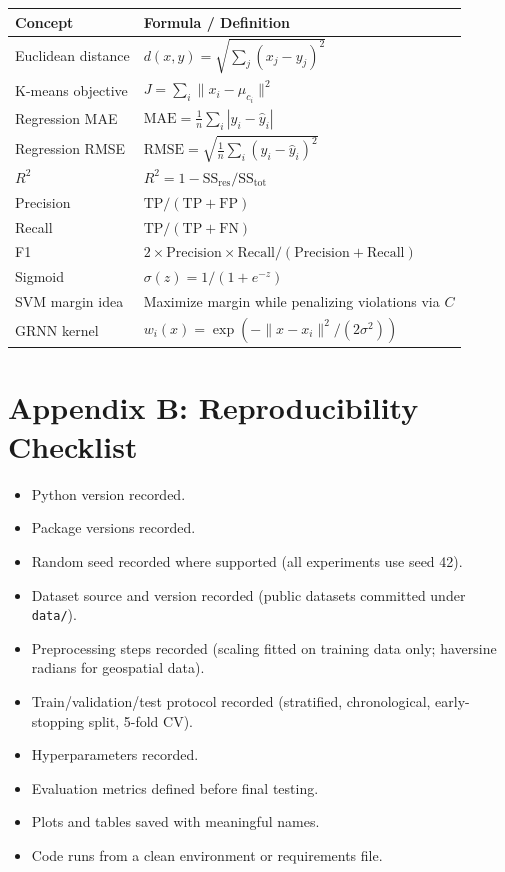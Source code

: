 \begin{longtable}{|p{}|p{}|}
\hline
\rowcolor{mlblue!8}\textbf{Concept} & \textbf{Formula / Definition} \\
\hline
\endhead
Euclidean distance & $d(x,y) = \sqrt{\sum_j (x_j - y_j)^2}$ \\
\hline
K-means objective & $J = \sum_i \lVert x_i - \mu_{c_i} \rVert^2$ \\
\hline
Regression MAE & $\mathrm{MAE} = \frac{1}{n}\sum_i |y_i - \hat{y}_i|$ \\
\hline
Regression RMSE & $\mathrm{RMSE} = \sqrt{\frac{1}{n}\sum_i (y_i - \hat{y}_i)^2}$ \\
\hline
$R^2$ & $R^2 = 1 - \mathrm{SS_{res}} / \mathrm{SS_{tot}}$ \\
\hline
Precision & $\mathrm{TP} / (\mathrm{TP} + \mathrm{FP})$ \\
\hline
Recall & $\mathrm{TP} / (\mathrm{TP} + \mathrm{FN})$ \\
\hline
F1 & $2 \times \mathrm{Precision} \times \mathrm{Recall} / (\mathrm{Precision} + \mathrm{Recall})$ \\
\hline
Sigmoid & $\sigma(z) = 1 / (1 + e^{-z})$ \\
\hline
SVM margin idea & Maximize margin while penalizing violations via $C$ \\
\hline
GRNN kernel & $w_i(x) = \exp\!\left(-\lVert x - x_i \rVert^2 / (2\sigma^2)\right)$ \\
\hline
\end{longtable}

\chapter*{Appendix B: Reproducibility Checklist}
{}

\begin{itemize}
  \item Python version recorded.
  \item Package versions recorded.
  \item Random seed recorded where supported (all experiments use seed 42).
  \item Dataset source and version recorded (public datasets committed under \texttt{data/}).
  \item Preprocessing steps recorded (scaling fitted on training data only; haversine radians for geospatial data).
  \item Train/validation/test protocol recorded (stratified, chronological, early-stopping split, 5-fold CV).
  \item Hyperparameters recorded.
  \item Evaluation metrics defined before final testing.
  \item Plots and tables saved with meaningful names.
  \item Code runs from a clean environment or requirements file.
\end{itemize}

